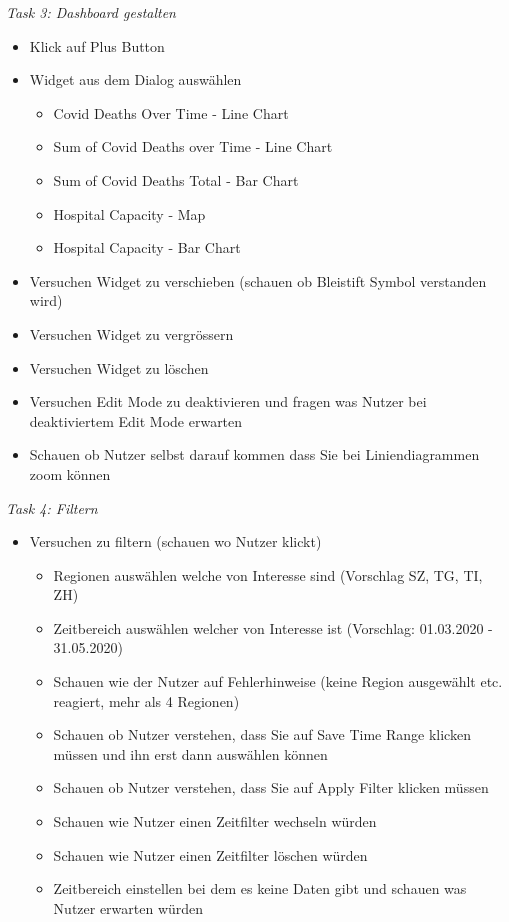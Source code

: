 \textit{Task 3: Dashboard gestalten}
\begin{itemize}
    \item Klick auf Plus Button
    \item Widget aus dem Dialog auswählen
    \begin{itemize}
        \item Covid Deaths Over Time - Line Chart
        \item Sum of Covid Deaths over Time - Line Chart
        \item Sum of Covid Deaths Total - Bar Chart
        \item Hospital Capacity - Map
        \item Hospital Capacity - Bar Chart
    \end{itemize}
    \item Versuchen Widget zu verschieben (schauen ob Bleistift Symbol verstanden wird)
    \item Versuchen Widget zu vergrössern
    \item Versuchen Widget zu löschen
    \item Versuchen Edit Mode zu deaktivieren und fragen was Nutzer bei deaktiviertem Edit Mode erwarten
    \item Schauen ob Nutzer selbst darauf kommen dass Sie bei Liniendiagrammen zoom können
\end{itemize}

\textit{Task 4: Filtern}
\begin{itemize}
\item Versuchen zu filtern (schauen wo Nutzer klickt)
    \begin{itemize}
        \item Regionen auswählen welche von Interesse sind (Vorschlag SZ, TG, TI, ZH)
        \item Zeitbereich auswählen welcher von Interesse ist (Vorschlag: 01.03.2020 - 31.05.2020)
        \item Schauen wie der Nutzer auf Fehlerhinweise (keine Region ausgewählt etc. reagiert, mehr als 4 Regionen)
        \item Schauen ob Nutzer verstehen, dass Sie auf Save Time Range klicken müssen und ihn erst dann auswählen können
        \item Schauen ob Nutzer verstehen, dass Sie auf Apply Filter klicken müssen
        \item Schauen wie Nutzer einen Zeitfilter wechseln würden
        \item Schauen wie Nutzer einen Zeitfilter löschen würden
        \item Zeitbereich einstellen bei dem es keine Daten gibt und schauen was Nutzer erwarten würden
    \end{itemize}
\end{itemize}

